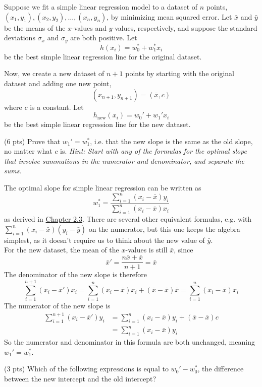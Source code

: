 \documentclass[11pt]{article}
\begin{document}
\newpage
\begin{prob}
Suppose we fit a simple linear regression model to a dataset of $n$ points, $(x_1,y_1),(x_2,y_2),\ldots,(x_n,y_n)$, by minimizing mean squared error. Let $\bar x$ and $\bar y$ be the means of the $x$-values and $y$-values, respectively, and suppose the standard deviations $\sigma_x$ and $\sigma_y$ are both positive. Let
\[
h(x_i)=w_0^*+w_1^*x_i
\]
be the best simple linear regression line for the original dataset.

Now, we create a new dataset of $n+1$ points by starting with the original dataset and adding one new point,
\[
(x_{n+1},y_{n+1})=(\bar x,c)
\]
where $c$ is a constant. Let
\[
h_{\text{new}}(x_i)=w_0'+w_1'x_i
\]
be the best simple linear regression line for the new dataset.

\begin{subprob}(6 pts) Prove that $w_1' = w_1^*$, i.e. that the new slope is the same as the old slope, no matter what $c$ is. \textit{Hint: Start with any of the formulas for the optimal slope that involve summations in the numerator and denominator, and separate the sums.} \\

\emptybox{10.5cm}
\begin{solution}
The optimal slope for simple linear regression can be written as
\[
w_1^*
=
\frac{\sum_{i=1}^n (x_i-\bar{x})y_i}{\sum_{i=1}^n (x_i-\bar{x}) x_i}
\]
as derived in \href{https://notes.eecs245.org/simple-linear-regression/finding-optimal-parameters/}{Chapter 2.3}. There are several other equivalent formulas, e.g. with $\sum_{i=1}^n (x_i-\bar{x})(y_i-\bar{y})$ on the numerator, but this one keeps the algebra simplest, as it doesn't require us to think about the new value of $\bar y$. \\

For the new dataset, the mean of the $x$-values is still $\bar{x}$, since
\[
\bar{x}'=\frac{n\bar{x}+\bar{x}}{n+1}=\bar{x}
\]
The denominator of the new slope is therefore
\[
\sum_{i=1}^{n+1}(x_i-\bar{x}')x_i
=
\sum_{i=1}^n(x_i-\bar{x})x_i + (\bar{x}-\bar{x})\bar{x}
=
\sum_{i=1}^n(x_i-\bar{x})x_i
\]
The numerator of the new slope is
\begin{align*}
\sum_{i=1}^{n+1}(x_i-\bar{x}')y_i
&=
\sum_{i=1}^{n}(x_i-\bar{x})y_i
+(\bar{x}-\bar{x})c \\
&=
\sum_{i=1}^{n}(x_i-\bar{x})y_i
\end{align*}
So the numerator and denominator in this formula are both unchanged, meaning $w_1'=w_1^*$.
\end{solution}
\end{subprob}
\begin{subprob}(3 pts) Which of the following expressions is equal to $w_0' - w_0^*$, the difference between the new intercept and the old intercept? \\


\end{subprob}
\end{prob}
\end{document}
